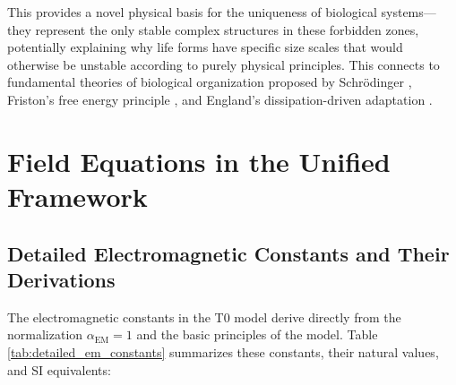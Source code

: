\documentclass[twocolumn,aps,prl]{revtex4-2}
\begin{document}
	This provides a novel physical basis for the uniqueness of biological systems—they represent the only stable complex structures in these forbidden zones, potentially explaining why life forms have specific size scales that would otherwise be unstable according to purely physical principles. This connects to fundamental theories of biological organization proposed by Schrödinger \cite{Schrodinger1944}, Friston’s free energy principle \cite{Friston2010}, and England’s dissipation-driven adaptation \cite{England2013}.
	
	\section{Field Equations in the Unified Framework}
	\label{sec:field_equations}
	
	\subsection{Detailed Electromagnetic Constants and Their Derivations}
	\label{subsec:detailed_em_constants}
	
	The electromagnetic constants in the T0 model derive directly from the normalization $\alpha_{\text{EM}} = 1$ and the basic principles of the model. Table \ref{tab:detailed_em_constants} summarizes these constants, their natural values, and SI equivalents:
	
\end{document}
